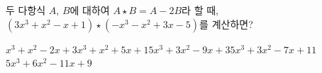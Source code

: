 두 다항식 $A$, $B$에 대하여 $A\star B=A-2B$라 할 때, $(3x^3+x^2-x+1)\star(-x^3-x^2+3x-5)$를 계산하면?
\begin{choicesii}{$x^3+x^2-2x+3$}{$x^3+x^2+5x+1$}{$5x^3+3x^2-9x+3$}{$5x^3+3x^2-7x+11$}{$5x^3+6x^2-11x+9$}\end{choicesii}

